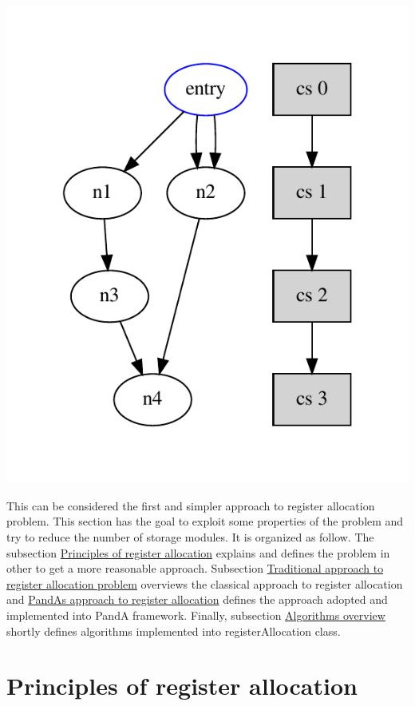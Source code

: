 \begin{DoxyImageNoCaption}
  \mbox{\includegraphics[width=\textwidth,height=\textheight/2,keepaspectratio=true]{dot_inline_dotgraph_21}}
\end{DoxyImageNoCaption}
 This can be considered the first and simpler approach to register allocation problem. This section has the goal to exploit some properties of the problem and try to reduce the number of storage modules. It is organized as follow. The subsection \hyperlink{src_HLS_registerAllocation_page_definition}{Principles of register allocation} explains and defines the problem in other to get a more reasonable approach. Subsection \hyperlink{src_HLS_registerAllocation_page_traditional}{Traditional approach to register allocation problem} overviews the classical approach to register allocation and \hyperlink{src_HLS_registerAllocation_page_pandaApproach}{PandA\textquotesingle{}s approach to register allocation} defines the approach adopted and implemented into PandA framework. Finally, subsection \hyperlink{src_HLS_registerAllocation_page_algorithms}{Algorithms overview} shortly defines algorithms implemented into register\+Allocation class.\hypertarget{src_HLS_registerAllocation_page_definition}{}\section{Principles of register allocation}\label{src_HLS_registerAllocation_page_definition}

